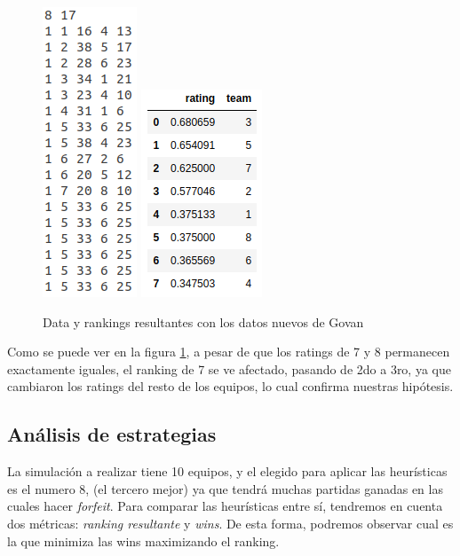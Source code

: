 \documentclass[a4paper]{article}
\begin{document}
\begin{figure}[H]
    \begin{center}
        \includegraphics[scale=0.75]{img/justo/govan-new.png}
        \includegraphics[scale=0.75]{img/justo/govan-rating-new.png}
        \caption{Data y rankings resultantes con los datos nuevos de Govan}
        \label{govan-new}
    \end{center}
\end{figure}

Como se puede ver en la figura \ref{govan-new}, a pesar de que los ratings de 7 y 8 permanecen exactamente iguales, el ranking de 7 se ve afectado, pasando de 2do a 3ro, ya que cambiaron los ratings del resto de los equipos, lo cual confirma nuestras hipótesis.

\subsection{Análisis de estrategias}

La simulación a realizar tiene 10 equipos, y el elegido para aplicar las heurísticas es el numero 8, (el tercero mejor) ya que tendrá muchas partidas ganadas en las cuales hacer \textit{forfeit}. Para comparar las heurísticas entre sí, tendremos en cuenta dos métricas: \textit{ranking resultante} y \textit{wins}. De esta forma, podremos observar cual es la que minimiza las wins maximizando el ranking.
\end{document}
